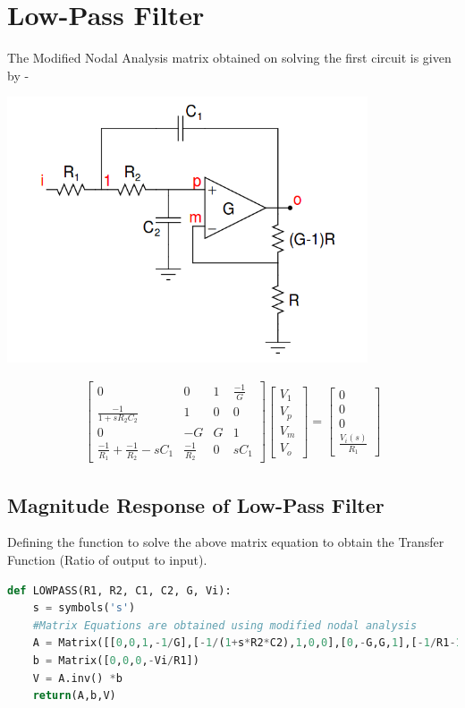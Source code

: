 \documentclass[a4paper]{article}
\begin{document}
\section{Low-Pass Filter}
The Modified Nodal Analysis matrix obtained on solving the first circuit is given by -
\begin{center}
\includegraphics[width=0.8\textwidth]{Selection_001.png}
\end{center}
\begin{gather}
 \begin{bmatrix} 0 & 0 & 1 & \frac{-1}{G} \\  \frac{-1}{1+sR_{2}C_{2}} & 1 & 0 & 0  \\ 0 & -G & G & 1 \\\frac{-1}{R_{1}}+\frac{-1}{R_{2}} - sC_{1} & \frac{-1}{R_{2}} & 0 & sC_{1} \end{bmatrix}
 \begin{bmatrix}
 V_{1} \\ V_{p} \\V_{m}\\V_{o}
 \end{bmatrix}
 =
  \begin{bmatrix}
 0 \\ 0 \\ 0 \\ \frac{V_{i}(s)}{R_{1}}
   \end{bmatrix}
\end{gather}
\subsection{Magnitude Response of Low-Pass Filter}
Defining the function to solve the above matrix equation to obtain the Transfer Function  (Ratio of output to input).
\begin{lstlisting}[language=Python]
def LOWPASS(R1, R2, C1, C2, G, Vi):
	s = symbols('s')
	#Matrix Equations are obtained using modified nodal analysis
	A = Matrix([[0,0,1,-1/G],[-1/(1+s*R2*C2),1,0,0],[0,-G,G,1],[-1/R1-1/R2-s*C1,1/R2,0,s*C1]])
	b = Matrix([0,0,0,-Vi/R1])
	V = A.inv() *b
	return(A,b,V)
\end{lstlisting}
\end{document}
